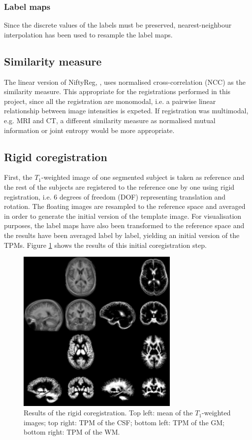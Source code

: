 \subsubsection{Label maps} Since the discrete values of the labels must be preserved, nearest-neighbour interpolation has been used to resample the label maps.



\subsection{Similarity measure}
The linear version of NiftyReg, , uses normalised cross-correlation (NCC) as the similarity measure. This appropriate for the registrations performed in this project, since all the registration are monomodal, i.e. a pairwise linear relationship between image intensities is expeted. If registration was multimodal, e.g. MRI and CT, a different similarity measure as normalised mutual information or joint entropy would be more appropriate.



\subsection{Rigid coregistration}
First, the $T_1$-weighted image of one segmented subject is taken as reference and the rest of the subjects are registered to the reference one by one using rigid registration, i.e. 6 degrees of freedom (DOF) representing translation and rotation. The floating images are resampled to the reference space and averaged in order to generate the initial version of the template image. For visualisation purposes, the label maps have also been transformed to the reference space and the results have been averaged label by label, yielding an initial version of the TPMs. Figure \ref{fig:template-rigid} shows the results of this initial coregistration step.

\begin{figure}
  \centering
  \includegraphics[width=0.7\textwidth]{figures/rigid_template_collage}
  \caption{Results of the rigid coregistration. Top left: mean of the $T_1$-weighted images; top right: TPM of the CSF; bottom left: TPM of the GM; bottom right: TPM of the WM.}
  \label{fig:template-rigid}
\end{figure}

